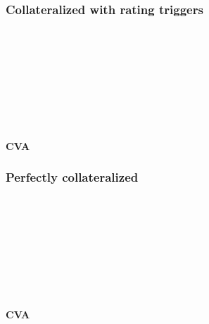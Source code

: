 \subsubsection{Collateralized with rating triggers}
	
	\shortRateRTFOBB\hfill\\
	\LGDIRTFOBB\hfill\\
	\LGDCRTFOBB\hfill\\
	\simulationsRTFOBB\hfill\\
	\cbvaRTFOBB\hfill\\
	\cdvaRTFOBB\hfill\\
	\ccvaRTFOBB\hfill\\
\begin{table}[h!]
	\tresholdsIRTFOBB%
\centering
\tresholdsIRTFOBBCaption
\label{tab:thresholds8}
\end{table}
\begin{table}[h!]
	\tresholdsCRTFOBB%
\centering
\tresholdsCRTFOBBCaption
\label{tab:thresholds9}
\end{table}
	
\paragraph*{CVA}
	
\subsubsection{Perfectly collateralized}
	
	\shortRatePCFOBB\hfill\\
	\LGDIPCFOBB\hfill\\
	\LGDCPCFOBB\hfill\\
	\simulationsPCFOBB\hfill\\
	\cbvaPCFOBB\hfill\\
	\cdvaPCFOBB\hfill\\
	\ccvaPCFOBB\hfill\\
\begin{table}[h!]
	\tresholdsIPCFOBB%
\centering
\tresholdsIPCFOBBCaption
\label{tab:thresholds8}
\end{table}
\begin{table}[h!]
	\tresholdsCPCFOBB%
\centering
\tresholdsCPCFOBBCaption
\label{tab:thresholds9}
\end{table}
	
\paragraph*{CVA}
	
